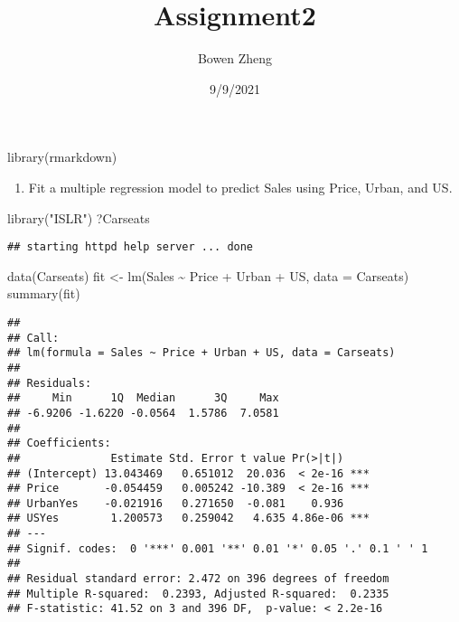 \documentclass[
]{article}
\title{Assignment2}
\author{Bowen Zheng}
\date{9/9/2021}
\newenvironment{Shaded}{\begin{snugshade}}{\end{snugshade}}
\newcommand{\AttributeTok}[1]{\textcolor[rgb]{0.77,0.63,0.00}{#1}}
\newcommand{\FunctionTok}[1]{\textcolor[rgb]{0.00,0.00,0.00}{#1}}
\newcommand{\NormalTok}[1]{#1}
\newcommand{\OtherTok}[1]{\textcolor[rgb]{0.56,0.35,0.01}{#1}}
\newcommand{\SpecialCharTok}[1]{\textcolor[rgb]{0.00,0.00,0.00}{#1}}
\newcommand{\StringTok}[1]{\textcolor[rgb]{0.31,0.60,0.02}{#1}}
\providecommand{\tightlist}{%
  \setlength{\itemsep}{0pt}\setlength{\parskip}{0pt}}
\begin{document}
\maketitle

\begin{Shaded}
\begin{Highlighting}[]
\FunctionTok{library}\NormalTok{(rmarkdown)}
\end{Highlighting}
\end{Shaded}

\begin{enumerate}
\def\labelenumi{(\alph{enumi})}
\tightlist
\item
  Fit a multiple regression model to predict Sales using Price, Urban,
  and US.
\end{enumerate}

\begin{Shaded}
\begin{Highlighting}[]
\FunctionTok{library}\NormalTok{(}\StringTok{"ISLR"}\NormalTok{)}
\NormalTok{?Carseats}
\end{Highlighting}
\end{Shaded}

\begin{verbatim}
## starting httpd help server ... done
\end{verbatim}

\begin{Shaded}
\begin{Highlighting}[]
\FunctionTok{data}\NormalTok{(Carseats)}
\NormalTok{fit }\OtherTok{\textless{}{-}} \FunctionTok{lm}\NormalTok{(Sales }\SpecialCharTok{\textasciitilde{}}\NormalTok{ Price }\SpecialCharTok{+}\NormalTok{ Urban }\SpecialCharTok{+}\NormalTok{ US, }\AttributeTok{data =}\NormalTok{ Carseats)}
\FunctionTok{summary}\NormalTok{(fit)}
\end{Highlighting}
\end{Shaded}

\begin{verbatim}
## 
## Call:
## lm(formula = Sales ~ Price + Urban + US, data = Carseats)
## 
## Residuals:
##     Min      1Q  Median      3Q     Max 
## -6.9206 -1.6220 -0.0564  1.5786  7.0581 
## 
## Coefficients:
##              Estimate Std. Error t value Pr(>|t|)    
## (Intercept) 13.043469   0.651012  20.036  < 2e-16 ***
## Price       -0.054459   0.005242 -10.389  < 2e-16 ***
## UrbanYes    -0.021916   0.271650  -0.081    0.936    
## USYes        1.200573   0.259042   4.635 4.86e-06 ***
## ---
## Signif. codes:  0 '***' 0.001 '**' 0.01 '*' 0.05 '.' 0.1 ' ' 1
## 
## Residual standard error: 2.472 on 396 degrees of freedom
## Multiple R-squared:  0.2393, Adjusted R-squared:  0.2335 
## F-statistic: 41.52 on 3 and 396 DF,  p-value: < 2.2e-16
\end{verbatim}
\end{document}
